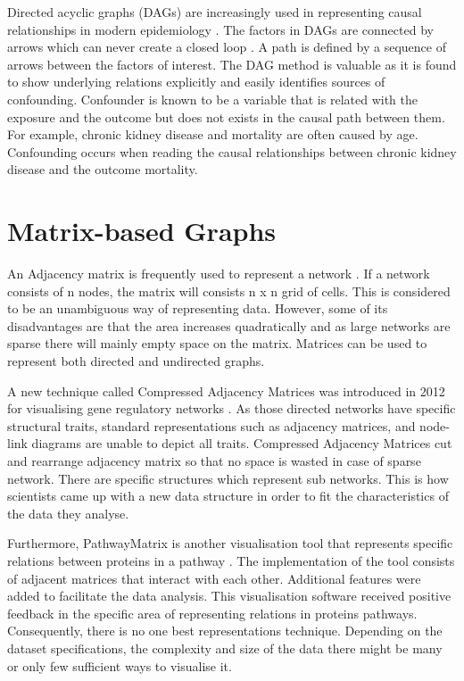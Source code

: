 \documentclass{l4proj}
\begin{document}
Directed acyclic graphs (DAGs) are increasingly used in representing causal relationships in modern epidemiology \cite{suttorp2015graphical}. The factors in DAGs are connected by arrows which can never create a closed loop \cite{greenland1999causal}. A path is defined by a sequence of arrows between the factors of interest. The DAG method is valuable as it is found to show underlying relations explicitly and easily identifies sources of confounding. Confounder is known to be a variable that is related with the exposure and the outcome but does not exists in the causal path between them. For example, chronic kidney disease and mortality are often caused by age. Confounding occurs when reading the causal relationships between chronic kidney disease and the outcome mortality. 

 

\section{Matrix-based Graphs}

An Adjacency matrix is frequently used to represent a network \cite{longabaugh2012combing}. If a network consists of n nodes, the matrix will consists n x n grid of cells. This is considered to be an unambiguous way of representing data. However, some of its disadvantages are that the area increases quadratically and as large networks are sparse there will mainly empty space on the matrix. Matrices can be used to represent both directed and undirected graphs. 

A new technique called Compressed Adjacency Matrices was introduced in 2012 for visualising gene regulatory networks \cite{dinkla2012compressed}. As those directed networks have specific structural traits, standard representations such as adjacency matrices, and node-link diagrams are unable to depict all traits. Compressed Adjacency Matrices cut and rearrange adjacency matrix so that no space is wasted in case of sparse network. There are specific structures which represent sub networks. This is how scientists came up with a new data structure in order to fit the characteristics of the data they analyse.

Furthermore, PathwayMatrix is another visualisation tool that represents specific relations between proteins in a pathway \cite{dang2015pathwaymatrix}. The implementation of the tool consists of adjacent matrices that interact with each other. Additional features were added to facilitate the data analysis. This visualisation software received positive feedback in the specific area of representing relations in proteins pathways. Consequently, there is no one best representations technique. Depending on the dataset specifications, the complexity and size of the data there might be many or only few sufficient ways to visualise it.       
\end{document}
